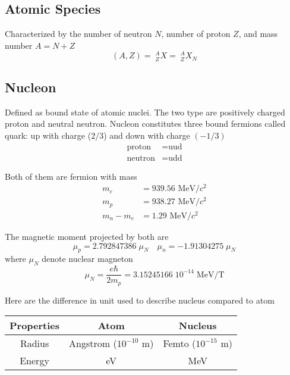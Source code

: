 \documentclass[../../../main.tex]{subfiles}
\begin{document}
\subsection*{Atomic Species}
Characterized by the number of neutron $N$, number of proton $Z$, and mass number $A=N+Z$
\begin{equation*}
    (A,Z)= \;^A_ZX= \;^A_ZX_N
\end{equation*}

\subsection*{Nucleon}
Defined as bound state of atomic nuclei. The two type are positively charged proton and neutral neutron. Nucleon constitutes three bound fermions called quark: up with charge ($2/3$) and down with charge $(-1/3)$
\begin{align*}
    \text{proton}&=\text{uud}\\
    \text{neutron}&=\text{udd}
\end{align*}

Both of them are fermion with mass 
\begin{align*}
    m_e&=939.56 \text{ MeV}/c^2\\ 
    m_p &= 938.27 \text{ MeV}/c^2\\
     m_n-m_e&=1.29 \text{ MeV}/c^2
\end{align*}

The magnetic moment projected by both are 
\begin{equation*}
    \mu_p=2.792 847 386  \;\mu_N\quad \mu_n=-1.913 042 75\;\mu_N
\end{equation*}
where $\mu_N$ denote nuclear magneton
\begin{equation*}
    \mu_N=\frac{e\hbar}{2m_p}=3.152 451 66\; 10^{-14}\;\text{MeV/T}
\end{equation*}

Here are the difference in unit used to describe nucleus compared to atom 
\begin{center}
    \begin{tabular}{c c c} 
        \toprule
        Properties&Atom&Nucleus\\ 
        \midrule
        Radius&Angstrom ($10^{-10}$ m)&Femto ($10^{-15}$ m)\\
        Energy&eV&MeV\\ \bottomrule
    \end{tabular}
\end{center}
\end{document}
